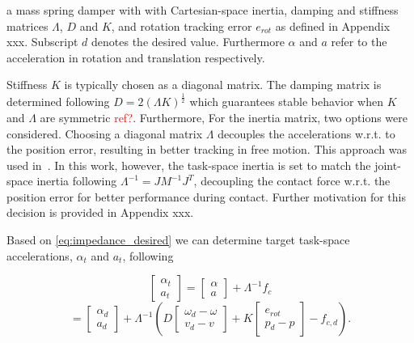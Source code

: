 \documentclass[a4paper, 10pt, conference]{ieeeconf}
\begin{document}
    a mass spring damper with with Cartesian-space inertia, damping and stiffness matrices $\Lambda$, $D$ and $K$, and rotation tracking error $e_{rot}$ as defined in Appendix xxx. Subscript $d$ denotes the desired value. Furthermore $\alpha$ and $a$ refer to the acceleration in rotation and translation respectively.

    Stiffness $K$ is typically chosen as a diagonal matrix. The damping matrix is determined following $D = 2(\Lambda K)^{\frac{1}{2}}$ which guarantees stable behavior when $K$ and $\Lambda$ are symmetric \textcolor{red}{ref?}. Furthermore, For the inertia matrix, two options were considered. Choosing a diagonal matrix $\Lambda$ decouples the accelerations w.r.t. to the position error, resulting in better tracking in free motion. This approach was used in~\cite{vanoorschotDesignNumericalValidation2022}. In this work, however, the task-space inertia is set to match the joint-space inertia following $\Lambda^{-1} = JM^{-1}J^T$, decoupling the contact force w.r.t. the position error for better performance during contact. Further motivation for this decision is provided in Appendix xxx. %

    Based on \ref{eq:impedance_desired} we can determine target task-space accelerations, $\alpha_t$ and $a_t$, following
    
$$
    \begin{bmatrix} \alpha_{t} \\ a_{t} \end{bmatrix} 
    = 
    \begin{bmatrix} \alpha \\ a \end{bmatrix} +
    \Lambda^{-1} f_{c}
$$
    $$
     =     \begin{bmatrix} \alpha_d    \\ a_d  \end{bmatrix} +\Lambda^{-1} \left ( D \begin{bmatrix} \omega_d - {\omega} \\ v_d - v \end{bmatrix}  + K \begin{bmatrix} e_{rot} \\p_d - {p}  \end{bmatrix}- f_{c,d} \right ).
$$
\end{document}
